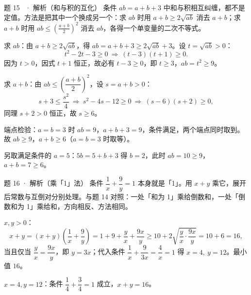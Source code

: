 \begin{solution}{题 15 \starred\ · 解析（和与积的互化）}
\think 条件 $ab=a+b+3$ 中和与积相互纠缠，都不是定值。方法是把其中一个换成另一个：求 $ab$ 时用 $a+b\ge 2\sqrt{ab}$ 消去 $a+b$；求 $a+b$ 时用 $ab\le\left(\frac{a+b}2\right)^2$ 消去 $ab$，各得一个单变量的二次不等式。

\solve 求 $ab$：由 $a+b\ge 2\sqrt{ab}$，得 $ab=a+b+3\ge 2\sqrt{ab}+3$。设 $t=\sqrt{ab}>0$：
\[
t^2-2t-3\ge 0\ \Longrightarrow\ (t-3)(t+1)\ge 0.
\]
因为 $t>0$，因式 $t+1$ 恒正，故必有 $t-3\ge 0$，即 $t\ge 3$，$ab=t^2\ge 9$。

求 $a+b$：由 $ab\le\left(\dfrac{a+b}2\right)^2$，设 $s=a+b>0$：
\[
s+3\le\frac{s^2}{4}\ \Longrightarrow\ s^2-4s-12\ge 0\ \Longrightarrow\ (s-6)(s+2)\ge 0,
\]
同理 $s+2>0$ 恒正，故 $s\ge 6$。

端点检验：$a=b=3$ 时 $ab=9$，$a+b+3=9$，条件满足，两个端点同时取到。故 $ab\ge 9$，$a+b\ge 6$（$a=b=3$ 时取等）。

\checkup 另取满足条件的 $a=5$：$5b=5+b+3$ 得 $b=2$，此时 $ab=10\ge 9$，$a+b=7\ge 6$。

\end{solution}

\begin{solution}{题 16 · 解析（乘「1」法）}
\think 条件 $\dfrac1x+\dfrac9y=1$ 本身就是「1」。用 $x+y$ 乘它，展开后常数与互倒对分别处理。与题 14 对照：一处「和为 1」乘给倒数和，一处「倒数和为 1」乘给和，方向相反、方法相同。

\solve $x,y>0$：
\[
x+y=(x+y)\left(\frac1x+\frac9y\right)=1+9+\frac yx+\frac{9x}{y}\ge 10+2\sqrt{\frac yx\cdot\frac{9x}y}=10+6=16,
\]
当且仅当 $\dfrac yx=\dfrac{9x}y$，即 $y=3x$；代入条件 $\dfrac1x+\dfrac{9}{3x}=\dfrac4x=1$ 得 $x=4,\ y=12$。最小值 $16$。

\checkup $x=4,y=12$：条件 $\dfrac14+\dfrac34=1$ 成立，$x+y=16$。

\end{solution}

